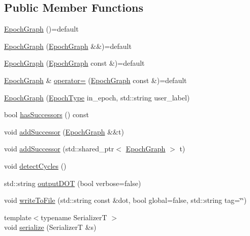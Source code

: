 \subsection*{Public Member Functions}
\begin{DoxyCompactItemize}
\item 
\hyperlink{structvt_1_1termination_1_1graph_1_1_epoch_graph_a2ad0e6af761b4ff43605ad9d3f33d709}{Epoch\+Graph} ()=default
\item 
\hyperlink{structvt_1_1termination_1_1graph_1_1_epoch_graph_a84f82857261951f8ec3670e6f5378898}{Epoch\+Graph} (\hyperlink{structvt_1_1termination_1_1graph_1_1_epoch_graph}{Epoch\+Graph} \&\&)=default
\item 
\hyperlink{structvt_1_1termination_1_1graph_1_1_epoch_graph_aabf50c2ebc474b7683742fe1e9d8d25a}{Epoch\+Graph} (\hyperlink{structvt_1_1termination_1_1graph_1_1_epoch_graph}{Epoch\+Graph} const \&)=default
\item 
\hyperlink{structvt_1_1termination_1_1graph_1_1_epoch_graph}{Epoch\+Graph} \& \hyperlink{structvt_1_1termination_1_1graph_1_1_epoch_graph_a5039bbba31fdc12c8f815c2621aa5722}{operator=} (\hyperlink{structvt_1_1termination_1_1graph_1_1_epoch_graph}{Epoch\+Graph} const \&)=default
\item 
\hyperlink{structvt_1_1termination_1_1graph_1_1_epoch_graph_a0c6ff768e115c90aaaaf72d390c5df42}{Epoch\+Graph} (\hyperlink{namespacevt_a985a5adf291c34a3ca263b3378388236}{Epoch\+Type} in\+\_\+epoch, std\+::string user\+\_\+label)
\item 
bool \hyperlink{structvt_1_1termination_1_1graph_1_1_epoch_graph_a1ab5f8a6b8107f2f08216f6036a81aa8}{has\+Successors} () const
\item 
void \hyperlink{structvt_1_1termination_1_1graph_1_1_epoch_graph_a5cce93e76f25941872d9176c8f3d6770}{add\+Successor} (\hyperlink{structvt_1_1termination_1_1graph_1_1_epoch_graph}{Epoch\+Graph} \&\&t)
\item 
void \hyperlink{structvt_1_1termination_1_1graph_1_1_epoch_graph_a9d611bd2b00472b7a66adc68aa86ff7f}{add\+Successor} (std\+::shared\+\_\+ptr$<$ \hyperlink{structvt_1_1termination_1_1graph_1_1_epoch_graph}{Epoch\+Graph} $>$ t)
\item 
void \hyperlink{structvt_1_1termination_1_1graph_1_1_epoch_graph_ab1b5d635c0d47e17fe1b5302370bf2d0}{detect\+Cycles} ()
\item 
std\+::string \hyperlink{structvt_1_1termination_1_1graph_1_1_epoch_graph_a75bdd706336677de5f3d5eb13428cf08}{output\+D\+OT} (bool verbose=false)
\item 
void \hyperlink{structvt_1_1termination_1_1graph_1_1_epoch_graph_a10aa0f193aeeb2f9389bff1bc6a4e4fc}{write\+To\+File} (std\+::string const \&dot, bool global=false, std\+::string tag=\char`\"{}\char`\"{})
\item 
{\footnotesize template$<$typename SerializerT $>$ }\\void \hyperlink{structvt_1_1termination_1_1graph_1_1_epoch_graph_aaa36d3e3ff2dc34ba2a36efbac7d7f16}{serialize} (SerializerT \&s)
\end{DoxyCompactItemize}
